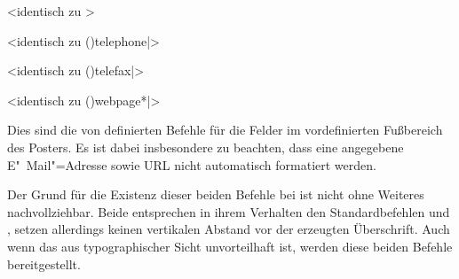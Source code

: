 \begin{DeclareEntity}{}
\begin{Declaration}
  {}
  <identisch zu >
\begin{Declaration}
  {}
<identisch zu \Macro*(){telephone|}>
\begin{Declaration}
  {}
  <identisch zu \Macro*(){telefax|}>
\begin{Declaration}
  {}
  <identisch zu \Macro*(){webpage*|}>
\printdeclarationlist

Dies sind die von  definierten Befehle für die Felder im 
vordefinierten Fußbereich des Posters. Es ist dabei insbesondere zu beachten, 
dass eine angegebene E"~Mail"=Adresse sowie URL nicht automatisch formatiert 
werden.
\end{Declaration}
\end{Declaration}
\end{Declaration}
\end{Declaration}

\begin{Declaration}
  {}
\begin{Declaration}
  {}
\printdeclarationlist

Der Grund für die Existenz dieser beiden Befehle bei  ist 
nicht ohne Weiteres nachvollziehbar. Beide entsprechen in ihrem Verhalten den 
Standardbefehlen  und , setzen allerdings 
keinen vertikalen Abstand vor der erzeugten Überschrift. Auch wenn das aus 
typographischer Sicht unvorteilhaft ist, werden diese beiden Befehle 
bereitgestellt.
\end{Declaration}
\end{Declaration}

\begin{Declaration}
  {}
\begin{Declaration}
  {}
\begin{Declaration}
  {}
\begin{Declaration}
  {}
\printdeclarationlist


\end{Declaration}
\end{Declaration}
\end{Declaration}
\end{Declaration}
\end{DeclareEntity}
